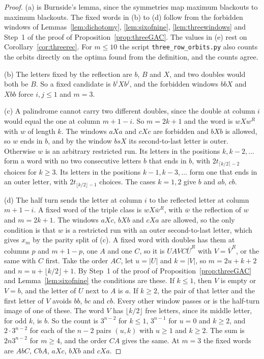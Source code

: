 \begin{proof}
(a) is Burnside's lemma, since the symmetries map maximum blackouts to maximum blackouts. The
fixed words in (b) to (d) follow from the forbidden windows of Lemmas~\ref{lem:dichotomy},
\ref{lem:sixofnine}, \ref{lem:threewindows} and Step~1 of the proof of
Proposition~\ref{prop:threeGAC}. The values in (e) rest on Corollary~\ref{cor:threerec}. For
$m\le10$ the script \texttt{three\_row\_orbits.py} also counts the orbits directly on the
optima found from the definition, and the counts agree.

(b) The letters fixed by the reflection are $b$, $B$ and $X$, and two doubles would both be
$B$. So a fixed candidate is $b^iXb^j$, and the forbidden windows $bbX$ and $Xbb$ force
$i,j\le1$ and $m=3$.

(c) A palindrome cannot carry two different doubles, since the double at column $i$ would
equal the one at column $m+1-i$. So $m=2k+1$ and the word is $wXw^R$ with $w$ of length $k$.
The windows $aXa$ and $cXc$ are forbidden and $bXb$ is allowed, so $w$ ends in $b$, and by the
window $bsX$ its second-to-last letter is outer. Otherwise $w$ is an arbitrary restricted run.
Its letters in the positions $k,k-2,\dots$ form a word with no two consecutive letters $b$
that ends in $b$, with $2t_{\lceil k/2\rceil-2}$ choices for $k\ge3$. Its letters in the
positions $k-1,k-3,\dots$ form one that ends in an outer letter, with
$2t_{\lfloor k/2\rfloor-1}$ choices. The cases $k=1,2$ give $b$ and $ab$, $cb$.

(d) The half turn sends the letter at column $i$ to the reflected letter at column $m+1-i$. A
fixed word of the triple class is $wX\overline{w}^R$, with $\overline{w}$ the reflection of
$w$ and $m=2k+1$. The windows $aXc$, $bXb$ and $cXa$ are allowed, so the only condition is
that $w$ is a restricted run with an outer second-to-last letter, which gives $x_m$ by the
parity split of (c). A fixed word with doubles has them at columns $p$ and $m+1-p$, one $A$
and one $C$, so it is $UAVC\overline U^R$ with $V=\overline V^R$, or the same with $C$ first.
Take the order $AC$, let $u=|U|$ and $k=|V|$, so $m=2u+k+2$ and $n=u+\lfloor k/2\rfloor+1$.
By Step~1 of the proof of Proposition~\ref{prop:threeGAC} and Lemma~\ref{lem:sixofnine} the
conditions are these. If $k\le1$, then $V$ is empty or $V=b$, and the letter of $U$ next to
$A$ is $a$. If $k\ge2$, the pair of that letter and the first letter of $V$ avoids $bb$, $bc$
and $cb$. Every other window passes or is the half-turn image of one of these. The word $V$ has $\lfloor k/2\rfloor$ free
letters, since its middle letter, for odd $k$, is $b$. So the count is $3^{n-2}$ for $k\le1$,
$3^{n-1}$ for $u=0$ and $k\ge2$, and $2\cdot3^{n-2}$ for each of the $n-2$ pairs $(u,k)$ with
$u\ge1$ and $k\ge2$. The sum is $2n3^{n-2}$ for $m\ge4$, and the order $CA$ gives the same.
At $m=3$ the fixed words are $AbC$, $CbA$, $aXc$, $bXb$ and $cXa$.
\end{proof}
